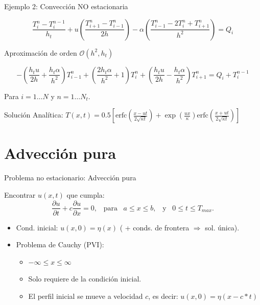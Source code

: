 \documentclass{beamer}
\begin{document}
\begin{frame}{Ejemplo 2: Convección NO estacionaria}

{\small 
\[
\frac{T_i^n - T_i^{n-1}}{h_t} +
u \left(\frac{T_{i+1}^n - T_{i-1}^n}{2h}\right) -
\alpha \left(\frac{T_{i-1}^n - 2T_{i}^n + T_{i+1}^n}{h^2}\right) = Q_i 
\]
%
\begin{center}
	Aproximación de orden $\mathcal{O}(h^2, h_t)$
\end{center}
%
\[
\boxed{
	-\left(\frac{h_t u}{2h} + \frac{h_t \alpha}{h^2}\right) T_{i-1}^n +
	\left(\frac{2 h_t \alpha}{h^2} + 1\right) T_i^n +
	\left(\frac{h_t u}{2h} - \frac{h_t \alpha}{h^2}\right) T_{i+1}^n = Q_i + T_i^{n-1}}
\]

\begin{center}
	Para $i = 1 \dots N$ y $n = 1 \dots N_t$.
\end{center}

\strut

{\footnotesize Solución Analítica:
$\displaystyle
\boxed{
T(x,t) = 0.5  \left[\text{erfc}\left(\frac{x - ut}{2 \sqrt{\kappa t}}\right) +
					\exp\left(\frac{u x}{\kappa}\right)
					\text{erfc}\left(\frac{x + ut}{2 \sqrt{\kappa t}}\right) \right]
}
$
}

}

\end{frame}


\section{Advección pura}

\begin{frame}{Problema no estacionario: Advecci\'on pura}

Encontrar $u(x,t)$ que cumpla:
\[
\frac{\partial u}{\partial t} +  c \frac{\partial u}{\partial x}  = 0,
\,\,\, \text{ para } \,\,\, a \leq x \leq b, \,\,\, \text{ y } \,\,\, 0 \leq t \leq T_{max}.
\]

\begin{itemize}
\item Cond. inicial: $u(x,0) = \eta(x)$ ( + conds. de frontera $\Longrightarrow$ sol. \'unica).
\item Problema de Cauchy (PVI): 
\begin{itemize}
\item $-\infty \leq x \leq \infty$ 
\item Solo requiere de la condici\'on inicial.
\item El perfil inicial se mueve a velocidad $c$, es decir: $u(x,0) = \eta(x - c * t)$
\end{itemize}

\end{itemize}

\end{frame}
\end{document}
